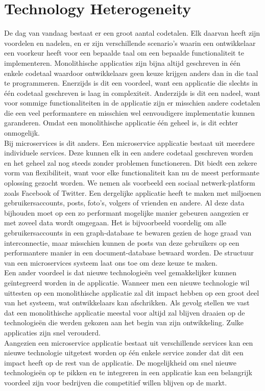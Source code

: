\documentclass[pdftex,a4paper,12pt,twoside]{report}
\begin{document}
\section{Technology Heterogeneity}
\label{sec:technology-heterogeneity}

De dag van vandaag bestaat er een groot aantal codetalen. Elk daarvan heeft zijn voordelen en nadelen, en er zijn verschillende scenario's waarin een ontwikkelaar een voorkeur heeft voor een bepaalde taal om een bepaalde functionaliteit te implementeren. Monolithische applicaties zijn bijna altijd geschreven in één enkele codetaal waardoor ontwikkelaars geen keuze krijgen anders dan in die taal te programmeren. Enerzijds is dit een voordeel, want een applicatie die slechts in één codetaal geschreven is laag in complexiteit. Anderzijds is dit een nadeel, want voor sommige functionaliteiten in de applicatie zijn er misschien andere codetalen die een veel performantere en misschien wel eenvoudigere implementatie kunnen garanderen. Omdat een monolithische applicatie één geheel is, is dit echter onmogelijk.
\\
Bij microservices is dit anders. Een microservice applicatie bestaat uit meerdere individuele services. Deze kunnen elk in een andere codetaal geschreven worden en het geheel zal nog steeds zonder problemen functioneren. Dit biedt een zekere vorm van flexibiliteit, want voor elke functionaliteit kan nu de meest performante oplossing gezocht worden. We nemen als voorbeeld een sociaal netwerk-platform zoals Facebook of Twitter. Een dergelijke applicatie heeft te maken met miljoenen gebruikersaccounts, posts, foto's, volgers of vrienden en andere. Al deze data bijhouden moet op een zo performant mogelijke manier gebeuren aangezien er met zoveel data wordt omgegaan. Het is bijvoorbeeld voordelig om alle gebruikersaccounts in een graph-database te bewaren gezien de hoge graad van interconnectie, maar misschien kunnen de posts van deze gebruikers op een performantere manier in een document-database bewaard worden. De structuur van een microservices systeem laat ons toe om deze keuze te maken.
\\
Een ander voordeel is dat nieuwe technologieën veel gemakkelijker kunnen geïntegreerd worden in de applicatie. Wanneer men een nieuwe technologie wil uittesten op een monolithische applicatie zal dit impact hebben op een groot deel van het systeem, wat ontwikkelaars kan afschrikken. Als gevolg stellen we vast dat een monolithische applicatie meestal voor altijd zal blijven draaien op de technologieën die werden gekozen aan het begin van zijn ontwikkeling. Zulke applicaties zijn snel verouderd.
\\
Aangezien een microservice applicatie bestaat uit verschillende services kan een nieuwe technologie uitgetest worden op één enkele service zonder dat dit een impact heeft op de rest van de applicatie. De mogelijkheid om snel nieuwe technologieën op te pikken en te integreren in een applicatie kan een belangrijk voordeel zijn voor bedrijven die competitief willen blijven op de markt.
\end{document}
